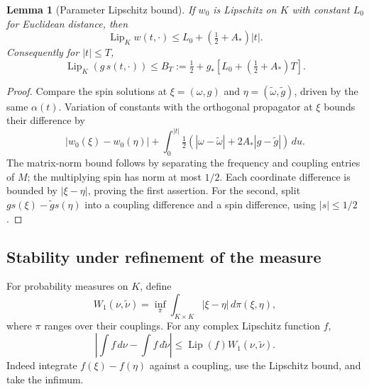 \documentclass[11pt]{article}
\newtheorem{lemma}[theorem]{Lemma}
\theoremstyle{remark}
\begin{document}
\begin{lemma}[Parameter Lipschitz bound]
\label{lem:v20v63-lipschitz}
If \(w_0\) is Lipschitz on \(K\) with constant \(L_0\)
for Euclidean distance, then
\[
 \operatorname{Lip}_K w(t,\cdot)
              \leq L_0+(\tfrac12+A_*)|t|.
\]
Consequently for \(|t|\leq T\),
\[
 \operatorname{Lip}_K(g\,s(t,\cdot))
 \leq B_T:=\tfrac12+
              g_*[L_0+(\tfrac12+A_*)T].
\]
\end{lemma}
\begin{proof}
Compare the spin solutions at \(\xi=(\omega,g)\) and
\(\eta=(\widetilde\omega,\widetilde g)\), driven by the
same \(\alpha(t)\).  Variation of constants with the
orthogonal propagator at \(\xi\) bounds their difference by
\[
 |w_0(\xi)-w_0(\eta)|+
 \int_0^{|t|}\tfrac12
       (|\omega-\widetilde\omega|+
                           2A_*|g-\widetilde g|)\,du .
\]
The matrix-norm bound follows by separating the frequency
and coupling entries of \(M\); the multiplying spin has
norm at most \(1/2\).  Each coordinate difference is
bounded by \(|\xi-\eta|\), proving the first assertion.
For the second, split
\(g s(\xi)-\widetilde g s(\eta)\) into a coupling
difference and a spin difference, using \(|s|\leq1/2\).
\end{proof}

\subsection{Stability under refinement of the measure}

For probability measures on \(K\), define
\[
 W_1(\nu,\widetilde\nu)
  =\inf_{\pi}\int_{K\times K}|\xi-\eta|\,d\pi(\xi,\eta),
\]
where \(\pi\) ranges over their couplings.  For any
complex Lipschitz function \(f\),
\[
 \left|\int f\,d\nu-\int f\,d\widetilde\nu\right|
                    \leq\operatorname{Lip}(f)W_1(\nu,\widetilde\nu).
\]
Indeed integrate \(f(\xi)-f(\eta)\) against a coupling,
use the Lipschitz bound, and take the infimum.
\end{document}
